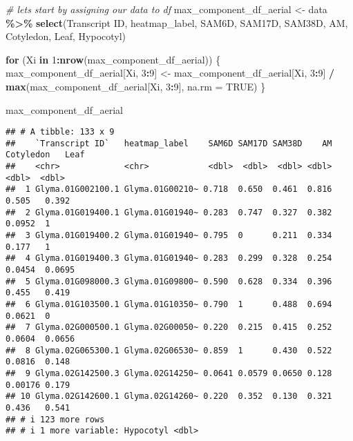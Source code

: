 \documentclass[
]{article}
\newenvironment{Shaded}{\begin{snugshade}}{\end{snugshade}}
\newcommand{\AttributeTok}[1]{\textcolor[rgb]{0.13,0.29,0.53}{#1}}
\newcommand{\CommentTok}[1]{\textcolor[rgb]{0.56,0.35,0.01}{\textit{#1}}}
\newcommand{\ConstantTok}[1]{\textcolor[rgb]{0.56,0.35,0.01}{#1}}
\newcommand{\ControlFlowTok}[1]{\textcolor[rgb]{0.13,0.29,0.53}{\textbf{#1}}}
\newcommand{\DecValTok}[1]{\textcolor[rgb]{0.00,0.00,0.81}{#1}}
\newcommand{\FunctionTok}[1]{\textcolor[rgb]{0.13,0.29,0.53}{\textbf{#1}}}
\newcommand{\NormalTok}[1]{#1}
\newcommand{\OtherTok}[1]{\textcolor[rgb]{0.56,0.35,0.01}{#1}}
\newcommand{\SpecialCharTok}[1]{\textcolor[rgb]{0.81,0.36,0.00}{\textbf{#1}}}
\newcommand{\StringTok}[1]{\textcolor[rgb]{0.31,0.60,0.02}{#1}}
\begin{document}
\begin{Shaded}
\begin{Highlighting}[]
\CommentTok{\# lets start by assigning our data to df}
\NormalTok{max\_component\_df\_aerial }\OtherTok{\textless{}{-}}\NormalTok{ data }\SpecialCharTok{\%\textgreater{}\%} 
  \FunctionTok{select}\NormalTok{(}\StringTok{\textasciigrave{}}\AttributeTok{Transcript ID}\StringTok{\textasciigrave{}}\NormalTok{, heatmap\_label, SAM6D, SAM17D, SAM38D, AM, Cotyledon, Leaf, Hypocotyl)}

\ControlFlowTok{for}\NormalTok{ (Xi }\ControlFlowTok{in} \DecValTok{1}\SpecialCharTok{:}\FunctionTok{nrow}\NormalTok{(max\_component\_df\_aerial)) \{}
\NormalTok{  max\_component\_df\_aerial[Xi, }\DecValTok{3}\SpecialCharTok{:}\DecValTok{9}\NormalTok{] }\OtherTok{\textless{}{-}}\NormalTok{ max\_component\_df\_aerial[Xi, }\DecValTok{3}\SpecialCharTok{:}\DecValTok{9}\NormalTok{] }\SpecialCharTok{/} \FunctionTok{max}\NormalTok{(max\_component\_df\_aerial[Xi, }\DecValTok{3}\SpecialCharTok{:}\DecValTok{9}\NormalTok{], }\AttributeTok{na.rm =} \ConstantTok{TRUE}\NormalTok{)}
\NormalTok{\}}

\NormalTok{max\_component\_df\_aerial}
\end{Highlighting}
\end{Shaded}

\begin{verbatim}
## # A tibble: 133 x 9
##    `Transcript ID`   heatmap_label    SAM6D SAM17D SAM38D    AM Cotyledon   Leaf
##    <chr>             <chr>            <dbl>  <dbl>  <dbl> <dbl>     <dbl>  <dbl>
##  1 Glyma.01G002100.1 Glyma.01G00210~ 0.718  0.650  0.461  0.816   0.505   0.392 
##  2 Glyma.01G019400.1 Glyma.01G01940~ 0.283  0.747  0.327  0.382   0.0952  1     
##  3 Glyma.01G019400.2 Glyma.01G01940~ 0.795  0      0.211  0.334   0.177   1     
##  4 Glyma.01G019400.3 Glyma.01G01940~ 0.283  0.299  0.328  0.254   0.0454  0.0695
##  5 Glyma.01G098000.3 Glyma.01G09800~ 0.590  0.628  0.334  0.396   0.455   0.419 
##  6 Glyma.01G103500.1 Glyma.01G10350~ 0.790  1      0.488  0.694   0.0621  0     
##  7 Glyma.02G000500.1 Glyma.02G00050~ 0.220  0.215  0.415  0.252   0.0604  0.0656
##  8 Glyma.02G065300.1 Glyma.02G06530~ 0.859  1      0.430  0.522   0.0816  0.148 
##  9 Glyma.02G142500.3 Glyma.02G14250~ 0.0641 0.0579 0.0650 0.128   0.00176 0.179 
## 10 Glyma.02G142600.1 Glyma.02G14260~ 0.220  0.352  0.130  0.321   0.436   0.541 
## # i 123 more rows
## # i 1 more variable: Hypocotyl <dbl>
\end{verbatim}
\end{document}
